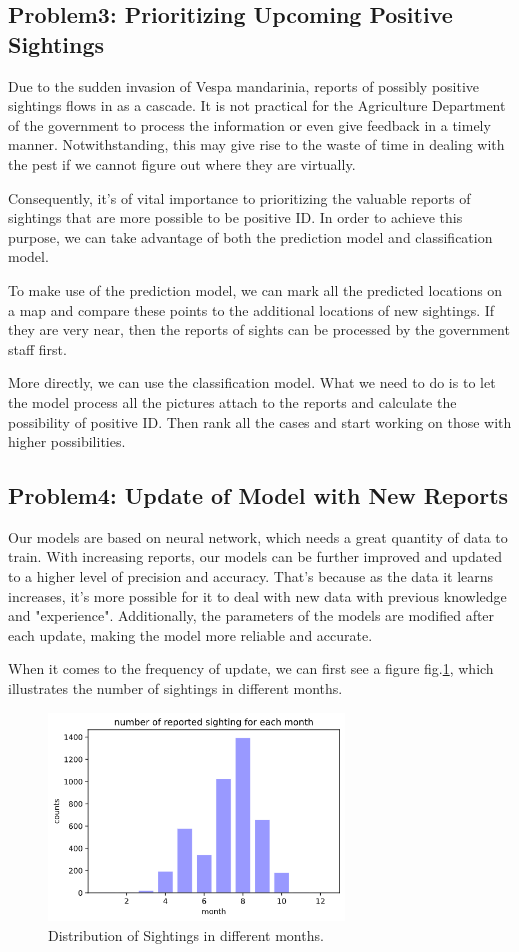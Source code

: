 \documentclass{mcmthesis}
\begin{document}
\subsection{Problem3: Prioritizing Upcoming Positive Sightings}
Due to the sudden invasion of Vespa mandarinia, reports of possibly positive sightings flows in as a cascade. It is not practical for the Agriculture Department of the government to process the information or even give feedback in a timely manner. Notwithstanding, this may give rise to the waste of time in dealing with the pest if we cannot figure out where they are virtually. 

Consequently, it's of vital importance to prioritizing the valuable reports of sightings that are more possible to be positive ID. In order to achieve this purpose, we can take advantage of both the prediction model and classification model. 

To make use of the prediction model, we can mark all the predicted locations on a map and compare these points to the additional locations of new sightings. If they are very near, then the reports of sights can be processed by the government staff first.

More directly, we can use the classification model. What we need to do is to let the model process all the pictures attach to the reports and calculate the possibility of positive ID. Then rank all the cases and start working on those with higher possibilities.
\subsection{Problem4: Update of Model with New Reports}
Our models are based on neural network, which needs a great quantity of data to train. With increasing reports, our models can be further improved and updated to a higher level of precision and accuracy. That's because as the data it learns increases, it's more possible for it to deal with new data with previous knowledge and "experience". Additionally, the parameters of the models are modified after each update, making the model more reliable and accurate.

When it comes to the frequency of update, we can first see a figure fig.\ref{fig:mon}, which illustrates the number of sightings in different months. 

\begin{figure}[!htbp]
	\centering
 	\includegraphics[width = 0.7\textwidth]{months.png} 
	\caption{Distribution of Sightings in different months.}
	\label{fig:mon}
\end{figure}
\end{document}
